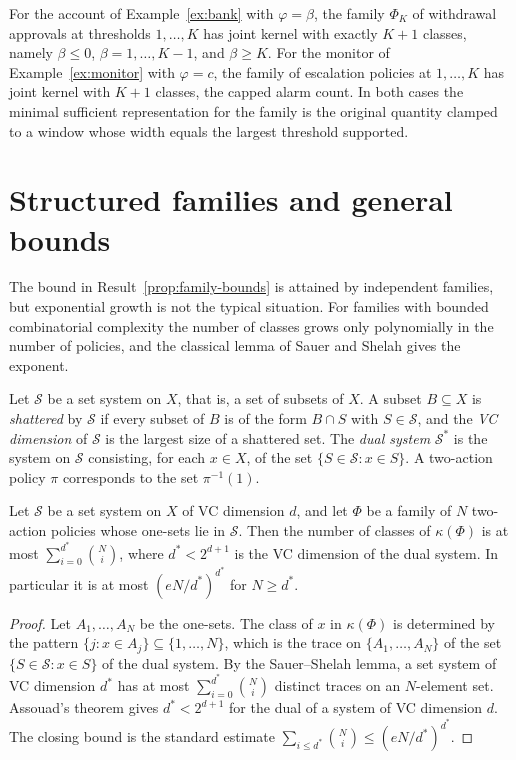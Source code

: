 \begin{example}
For the account of Example~\ref{ex:bank} with $\varphi=\beta$, the family $\Phi_K$ of withdrawal approvals at thresholds $1,\dots,K$ has joint kernel with exactly $K+1$ classes, namely $\beta\le0$, $\beta=1,\dots,K-1$, and $\beta\ge K$. For the monitor of Example~\ref{ex:monitor} with $\varphi=c$, the family of escalation policies at $1,\dots,K$ has joint kernel with $K+1$ classes, the capped alarm count. In both cases the minimal sufficient representation for the family is the original quantity clamped to a window whose width equals the largest threshold supported.
\end{example}

\section{Structured families and general bounds}

The bound in Result~\ref{prop:family-bounds} is attained by independent families, but exponential growth is not the typical situation. For families with bounded combinatorial complexity the number of classes grows only polynomially in the number of policies, and the classical lemma of Sauer and Shelah gives the exponent.

Let $\mathcal S$ be a set system on $X$, that is, a set of subsets of $X$. A subset $B\subseteq X$ is \emph{shattered} by $\mathcal S$ if every subset of $B$ is of the form $B\cap S$ with $S\in\mathcal S$, and the \emph{VC dimension} of $\mathcal S$ is the largest size of a shattered set. The \emph{dual system} $\mathcal S^{*}$ is the system on $\mathcal S$ consisting, for each $x\in X$, of the set $\{S\in\mathcal S:x\in S\}$. A two-action policy $\pi$ corresponds to the set $\pi^{-1}(1)$.

\begin{established}\label{thm:vc-bound}
Let $\mathcal S$ be a set system on $X$ of VC dimension $d$, and let $\Phi$ be a family of $N$ two-action policies whose one-sets lie in $\mathcal S$. Then the number of classes of $\kappa(\Phi)$ is at most $\sum_{i=0}^{d^{*}}\binom{N}{i}$, where $d^{*}<2^{d+1}$ is the VC dimension of the dual system. In particular it is at most $(eN/d^{*})^{d^{*}}$ for $N\ge d^{*}$.
\end{established}
\begin{proof}
Let $A_1,\dots,A_N$ be the one-sets. The class of $x$ in $\kappa(\Phi)$ is determined by the pattern $\{j:x\in A_j\}\subseteq\{1,\dots,N\}$, which is the trace on $\{A_1,\dots,A_N\}$ of the set $\{S\in\mathcal S: x\in S\}$ of the dual system. By the Sauer--Shelah lemma, a set system of VC dimension $d^{*}$ has at most $\sum_{i=0}^{d^{*}}\binom{N}{i}$ distinct traces on an $N$-element set. Assouad's theorem gives $d^{*}<2^{d+1}$ for the dual of a system of VC dimension $d$. The closing bound is the standard estimate $\sum_{i\le d^{*}}\binom{N}{i}\le(eN/d^{*})^{d^{*}}$.
\end{proof}

